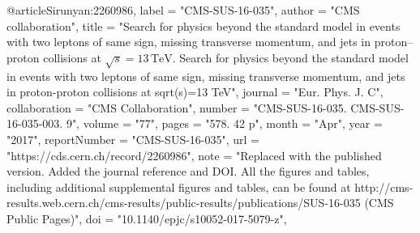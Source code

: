 @article{Sirunyan:2260986,
      label          = "CMS-SUS-16-035",
      author        = "{CMS collaboration}",
      title         = "{Search for physics beyond the standard model in events
                       with two leptons of same sign, missing transverse momentum,
                       and jets in proton--proton collisions at $\sqrt{s} =
                       13\,\text {TeV} $. Search for physics beyond the standard
                       model in events with two leptons of same sign, missing
                       transverse momentum, and jets in proton-proton collisions
                       at sqrt(s)=13 TeV}",
      journal       = "Eur. Phys. J. C",
      collaboration = "CMS Collaboration",
      number        = "CMS-SUS-16-035. CMS-SUS-16-035-003. 9",
      volume        = "77",
      pages         = "578. 42 p",
      month         = "Apr",
      year          = "2017",
      reportNumber  = "CMS-SUS-16-035",
      url           = "https://cds.cern.ch/record/2260986",
      note          = "Replaced with the published version. Added the journal
                       reference and DOI. All the figures and tables, including
                       additional supplemental figures and tables, can be found at
                       http://cms-results.web.cern.ch/cms-results/public-results/publications/SUS-16-035
                       (CMS Public Pages)",
      doi           = "10.1140/epjc/s10052-017-5079-z",
}

